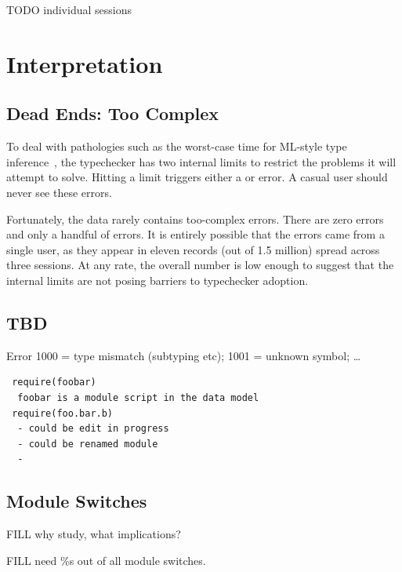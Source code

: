 \documentclass[english,submission,cleveref]{programming}
\begin{document}
TODO individual sessions


\section{Interpretation}

\subsection{Dead Ends: Too Complex}

To deal with pathologies such as the worst-case time for ML-style type
inference~\cite{m-popl-1990,ktu-caap-1990}, the typechecker
has two internal limits to restrict the problems it will attempt to solve.
Hitting a limit triggers either a  or
 error.
A casual user should never see these errors.

Fortunately, the data rarely contains too-complex errors.
There are zero  errors and only a
handful of  errors.
It is entirely possible that the  errors came from
a single user, as they appear in eleven records (out of 1.5 million)
spread across three sessions.
At any rate, the overall number is low enough to suggest that the internal
limits are not posing barriers to typechecker adoption.


\subsection{TBD}

Error 1000 = type mismatch (subtyping etc);
1001 = unknown symbol;
\ldots



\begin{verbatim}
 require(foobar)
  foobar is a module script in the data model
 require(foo.bar.b)
  - could be edit in progress
  - could be renamed module
  - 
\end{verbatim}


\subsection{Module Switches}

FILL why study, what implications?

FILL need \%s out of all module switches.
\end{document}
